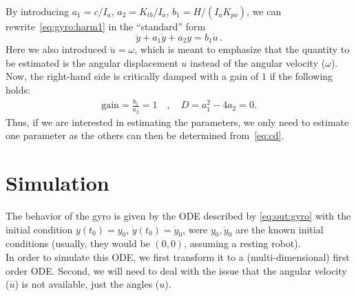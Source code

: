 \documentclass[a4paper]{article}
\begin{document}
By introducing 
$a_1 = c/I_a$, $a_2 = K_{tb}/I_a$, $b_1 = H/(I_aK_{po})$,
we can rewrite~\eqref{eq:gyro:harm1} in the ``standard'' form
\begin{equation}
\label{eq:out:gyro}
    \ddot{y} + a_1 \dot{y} + a_2 y = b_1 \dot{u}\,.
\end{equation}
Here we also introduced $\dot{u} = \omega$, which is meant to emphasize that 
the quantity to be estimated is the angular displacement $u$ instead of the 
angular velocity ($\omega$). Now, the right-hand side is critically damped 
with a gain of $1$ if the following holds:
\begin{equation}
\label{eq:cd}
\begin{split}
    \textrm{gain} = \frac{b_1}{a_2} = 1 
    \quad , \quad
    D = a_1^2 - 4 a_2 = 0 .
\end{split}    
\end{equation}
Thus, if we are interested in estimating the parameters, we only need to 
estimate one parameter as the others can then be determined from~\eqref{eq:cd}.

\section{Simulation}

The behavior of the gyro is given by the ODE described by \eqref{eq:out:gyro}
with the initial condition $y(t_0) = y_0$, $\dot{y}(t_0) = \dot{y}_0$,
were $y_0,\dot{y}_0$ are the known initial conditions (usually, they would be
$(0,0)$, assuming a resting robot). \\

In order to simulate this ODE, we first transform it to a (multi-dimensional)
first order ODE. Second, we will need to deal with the issue that 
the angular velocity ($\dot{u}$) is not available, just the angles ($u$). \\
 
\end{document}
